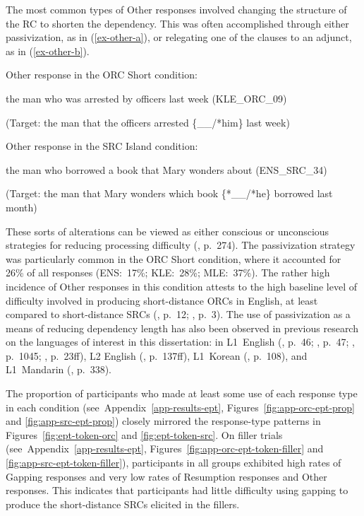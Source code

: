 The most common types of Other responses involved changing the structure of the RC to shorten the dependency. This was often accomplished through either passivization, as in (\ref{ex-other-a}), or relegating one of the clauses to an adjunct, as in (\ref{ex-other-b}).

\ex\label{ex-other-a}Other response in the ORC Short condition:
\par\nobreak\vspace{5pt}
the man who was arrested by officers last week (KLE\_ORC\_09)
\par\nobreak\vspace{5pt}
(Target: the man that the officers arrested \{\_\_/*him\} last week)
\xe 

\ex\label{ex-other-b}Other response in the SRC Island condition:
\par\nobreak\vspace{5pt}
the man who borrowed a book that Mary wonders about (ENS\_SRC\_34)
\par\nobreak\vspace{5pt}
(Target: the man that Mary wonders which book \{*\_\_/*he\} borrowed last month)
\xe

\noindent These sorts of alterations can be viewed as either conscious or unconscious strategies for reducing processing difficulty (\cite{ferreira.swets2005}, p.~274). The passivization strategy was particularly common in the ORC Short condition, where it accounted for 26\% of all responses (ENS:~17\%; KLE:~28\%; MLE:~37\%). The rather high incidence of Other responses in this condition attests to the high baseline level of difficulty involved in producing short-distance ORCs in English, at least compared to short-distance SRCs (\cite{gennari.macdonald2008}, p.~12; \cite{kim2013}, p.~3). The use of passivization as a means of reducing dependency length has also been observed in previous research on the languages of interest in this dissertation: in L1~English (\cite{fadlon.etal2019}, p.~46; \cite{kim2013}, p.~47; \cite{kim.ogrady2016}, p.~1045; \cite{zukowski2009}, p.~23ff), L2 English (\cite{kim2013}, p.~137ff), L1~Korean (\cite{kim2013}, p.~108), and L1~Mandarin (\cite{hsu.etal2009}, p.~338).

The proportion of participants who made at least some use of each response type in each condition (see~Appendix~\ref{app-results-ept}, Figures~\ref{fig:app-orc-ept-prop} and \ref{fig:app-src-ept-prop}) closely mirrored the response-type patterns in Figures~\ref{fig:ept-token-orc} and \ref{fig:ept-token-src}. On filler trials (see~Appendix~\ref{app-results-ept}, Figures~\ref{fig:app-orc-ept-token-filler} and \ref{fig:app-src-ept-token-filler}), participants in all groups exhibited high rates of Gapping responses and very low rates of Resumption responses and Other responses. This indicates that participants had little difficulty using gapping to produce the short-distance SRCs elicited in the fillers.

